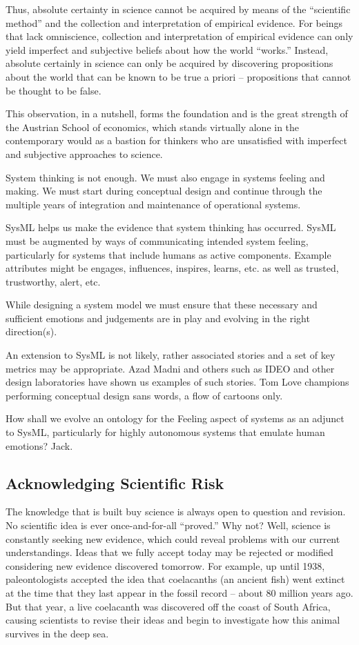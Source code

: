 Thus, absolute certainty in science cannot be acquired by means of the “scientific method” and the collection and interpretation of empirical evidence. For beings that lack omniscience, collection and interpretation of empirical evidence can only yield imperfect and subjective beliefs about how the world “works.”  Instead, absolute certainly in science can only be acquired by discovering propositions about the world that can be known to be true a priori – propositions that cannot be thought to be false.

This observation, in a nutshell, forms the foundation and is the great strength of the Austrian School of economics, which stands virtually alone in the contemporary would as a bastion for thinkers who are unsatisfied with imperfect and subjective approaches to science.

System thinking is not enough. We must also engage in systems feeling and making. We must start during conceptual design and continue through the multiple years of integration and maintenance of operational systems.

SysML helps us make the evidence that system thinking has occurred. SysML must be augmented by ways of communicating intended system feeling, particularly for systems that include humans as active components. Example attributes might be engages, influences, inspires, learns, etc. as well as trusted, trustworthy, alert, etc.

While designing a system model we must ensure that these necessary and sufficient emotions and judgements are in play and evolving in the right direction(s).

An extension to SysML is not likely, rather associated stories and a set of key metrics may be appropriate. Azad Madni and others such as IDEO and other design laboratories have shown us examples of such stories. Tom Love champions performing conceptual design sans words, a flow of cartoons only.

How shall we evolve an ontology for the Feeling aspect of systems as an adjunct to SysML, particularly for highly autonomous systems that emulate human emotions? Jack.

\subsection{Acknowledging Scientific Risk}

The knowledge that is built buy science is always open to question and revision. No scientific idea is ever once-and-for-all ``proved.''  Why not?  Well, science is constantly seeking new evidence, which could reveal problems with our current understandings. Ideas that we fully accept today may be rejected or modified considering new evidence discovered tomorrow. For example, up until 1938, paleontologists accepted the idea that coelacanths (an ancient fish) went extinct at the time that they last appear in the fossil record – about 80 million years ago. But that year, a live coelacanth was discovered off the coast of South Africa, causing scientists to revise their ideas and begin to investigate how this animal survives in the deep sea.

